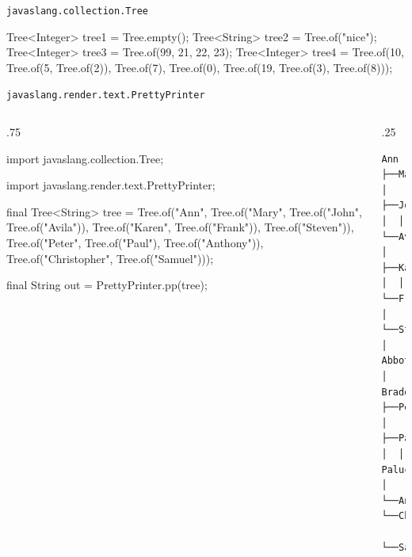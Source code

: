     
\begin{frame}{\texttt{javaslang.collection.Tree}}
\begin{pygmented}[]
Tree<Integer> tree1 = Tree.empty();
Tree<String> tree2 = Tree.of("nice");
Tree<Integer> tree3 = Tree.of(99, 21, 22, 23);
Tree<Integer> tree4 = Tree.of(10,
                              Tree.of(5, Tree.of(2)),
                              Tree.of(7),
                              Tree.of(0),
                              Tree.of(19, Tree.of(3), Tree.of(8)));
\end{pygmented}
    \begin{center}
    \end{center}
\end{frame}


\begin{frame}{\texttt{javaslang.render.text.PrettyPrinter}}
  \small
  \begin{columns}[t]
    \begin{column}{.75\textwidth}
\begin{pygmented}[]
import javaslang.collection.Tree;

import javaslang.render.text.PrettyPrinter;

final Tree<String> tree =
       Tree.of("Ann",
               Tree.of("Mary",
                       Tree.of("John",
                               Tree.of("Avila")),
                       Tree.of("Karen",
                               Tree.of("Frank")),
                       Tree.of("Steven\nAbbot\nBraddock")),
               Tree.of("Peter",
                       Tree.of("Paul\nPalucci"),
                       Tree.of("Anthony")),
               Tree.of("Christopher",
                       Tree.of("Samuel")));

final String out = PrettyPrinter.pp(tree);
\end{pygmented}
    \end{column}
    \begin{column}{.25\textwidth}
\begin{verbatim}
Ann
├──Mary
│  ├──John
│  │  └──Avila
│  ├──Karen
│  │  └──Frank
│  └──Steven
│     Abbot
│     Braddock
├──Peter
│  ├──Paul
│  │  Palucci
│  └──Anthony
└──Christopher
   └──Samuel
\end{verbatim}
    \end{column}
  \end{columns}
\end{frame}

